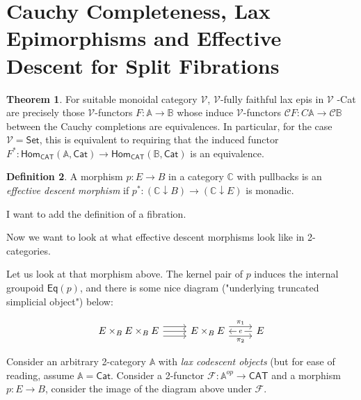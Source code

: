 \documentclass{article}
\numberwithin{equation}{section}
\theoremstyle{definition}
\newtheorem{thm}{Theorem}[section]
\theoremstyle{definition}
\newtheorem{defn}[thm]{Definition}
\theoremstyle{remark}
\theoremstyle{remark}
\begin{document}
		
	\section{Cauchy Completeness, Lax Epimorphisms and Effective Descent for Split Fibrations}

	\begin{thm}
		For suitable monoidal category $ \mathcal{V}$, $ \mathcal{V}$-fully faithful lax epis in $ \mathcal{V}$ \textsf{-Cat} are precisely those $ \mathcal{V}$-functors $ F: \mathbb{A} \longrightarrow \mathbb{B}$ whose induce $ \mathcal{V}$-functors $ \mathcal{C}F: C \mathbb{A} \longrightarrow \mathcal{C} \mathbb{B}$ between the Cauchy completions are equivalences. In particular, for the case $ \mathcal{V}= \textsf{Set}$, this is equivalent to requiring that the induced functor $ F^*: \textsf{Hom} _{\textsf{CAT}} ( \mathbb{A}, \textsf{Cat}) \longrightarrow \textsf{Hom}_{ \textsf{CAT}}( \mathbb{B}, \textsf{Cat})$ is an equivalence.
	\end{thm}
	
	\begin{defn}
		A morphism $ p: E \longrightarrow B$ in a category $ \mathbb{C}$ with pullbacks is an \textit{effective descent morphism} if $ p^*:( \mathbb{C} \downarrow B) \longrightarrow ( \mathbb{C} \downarrow E) $ is monadic.
	\end{defn}

	I want to add the definition of a fibration.

	Now we want to look at what effective descent morphisms look like in 2-categories.

	Let us look at that morphism above. The kernel pair of $p$ induces the internal groupoid $ \textsf{Eq}(p)$, and there is some nice diagram ("underlying truncated simplicial object") below:

		\[\begin{tikzcd}
			{E\times_BE\times_BE} & {E\times _B E} & E
			\arrow[from=1-1, to=1-2]
			\arrow[shift left=2, from=1-1, to=1-2]
			\arrow[shift right=2, from=1-1, to=1-2]
			\arrow["{\pi_1}", shift left=2, from=1-2, to=1-3]
			\arrow["{\pi_2}"', shift right=2, from=1-2, to=1-3]
			\arrow["e"{description}, from=1-3, to=1-2]
		\end{tikzcd}\]

	Consider an arbitrary 2-category $ \mathbb{A}$ with \textit{lax codescent objects} (but for ease of reading, assume $ \mathbb{A}= \textsf{Cat}$.
	Consider a 2-functor $ \mathcal{F}: \mathbb{A}^{op} \longrightarrow \textsf{CAT}$ and a morphism $ p: E \longrightarrow  B$, consider the image of the diagram above under $ \mathcal{F}$.
	
\end{document}
